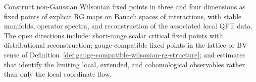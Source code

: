 \begin{openproblem}
\label{op:constructive-rg-nonperturbative-fixed-points}
Construct non-Gaussian Wilsonian fixed points in three and four dimensions as
fixed points of explicit RG maps on Banach spaces of interactions, with
stable manifolds, operator spectra, and reconstruction of the associated
local QFT data.  The open directions include: short-range scalar critical
fixed points with distributional reconstruction; gauge-compatible fixed
points in the lattice or BV sense of
Definition~\ref{def:gauge-compatible-wilsonian-rg-structure}; and estimates that
identify the limiting local, extended, and cohomological observables rather
than only the local coordinate flow.
\end{openproblem}
